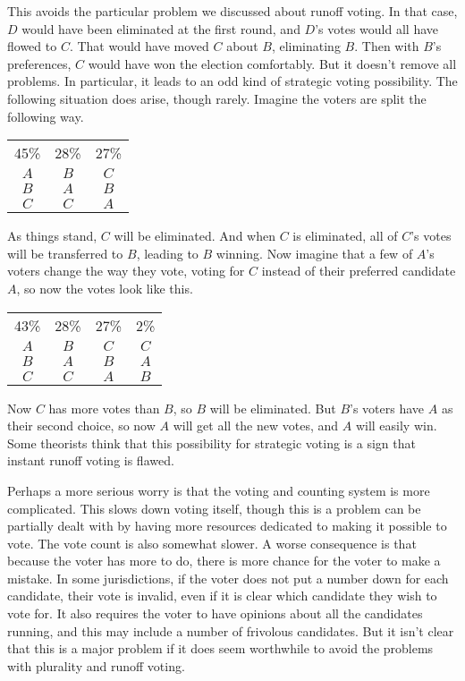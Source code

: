 \begin{multicols}{2}
This avoids the particular problem we discussed about runoff voting. In that case, $D$ would have been eliminated at the first round, and $D$'s votes would all have flowed to $C$. That would have moved $C$ about $B$, eliminating $B$. Then with $B$'s preferences, $C$ would have won the election comfortably. But it doesn't remove all problems. In particular, it leads to an odd kind of strategic voting possibility. The following situation does arise, though rarely. Imagine the voters are split the following way.
\begin{center}
\begin{tabular}{c c c}
45\% & 28\% &27\% \\
$A$ & $B$ & $C$ \\
$B$ & $A$ & $B$ \\
$C$ & $C$ & $A$
\end{tabular}
\end{center}
As things stand, $C$ will be eliminated. And when $C$ is eliminated, all of $C$'s votes will be transferred to $B$, leading to $B$ winning. Now imagine that a few of $A$'s voters change the way they vote, voting for $C$ instead of their preferred candidate $A$, so now the votes look like this.
\begin{center}
\begin{tabular}
{c c c c}
43\% & 28\% &27\% & 2\% \\ 
$A$ & $B$ & $C$ & $C$\\
$B$ & $A$ & $B$ & $A$ \\
$C$ & $C$ & $A$ & $B$
\end{tabular}
\end{center}
Now $C$ has more votes than $B$, so $B$ will be eliminated. But $B$'s voters have $A$ as their second choice, so now $A$ will get all the new votes, and $A$ will easily win. Some theorists think that this possibility for strategic voting is a sign that instant runoff voting is flawed.

Perhaps a more serious worry is that the voting and counting system is more complicated. This slows down voting itself, though this is a problem can be partially dealt with by having more resources dedicated to making it possible to vote. The vote count is also somewhat slower. A worse consequence is that because the voter has more to do, there is more chance for the voter to make a mistake. In some jurisdictions, if the voter does not put a number down for each candidate, their vote is invalid, even if it is clear which candidate they wish to vote for. It also requires the voter to have opinions about all the candidates running, and this may include a number of frivolous candidates. But it isn't clear that this is a major problem if it does seem worthwhile to avoid the problems with plurality and runoff voting.


\end{multicols}
